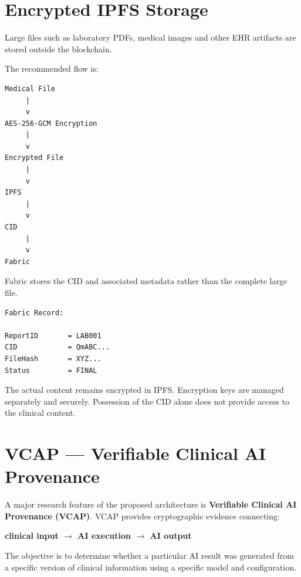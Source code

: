 \documentclass[11pt,a4paper]{article}
\begin{document}
\newpage
\section{Encrypted IPFS Storage}

Large files such as laboratory PDFs, medical images and other EHR artifacts are stored outside the blockchain.

The recommended flow is:

\begin{lstlisting}
Medical File
     |
     v
AES-256-GCM Encryption
     |
     v
Encrypted File
     |
     v
IPFS
     |
     v
CID
     |
     v
Fabric
\end{lstlisting}

Fabric stores the CID and associated metadata rather than the complete large file.

\begin{lstlisting}
Fabric Record:

ReportID       = LAB001
CID            = QmABC...
FileHash       = XYZ...
Status         = FINAL
\end{lstlisting}

The actual content remains encrypted in IPFS. Encryption keys are managed separately and securely. Possession of the CID alone does not provide access to the clinical content.

\newpage
\section{VCAP --- Verifiable Clinical AI Provenance}

A major research feature of the proposed architecture is \textbf{Verifiable Clinical AI Provenance (VCAP)}. VCAP provides cryptographic evidence connecting:

\begin{center}
\textbf{clinical input $\longrightarrow$ AI execution $\longrightarrow$ AI output}
\end{center}

The objective is to determine whether a particular AI result was generated from a specific version of clinical information using a specific model and configuration.
\end{document}
